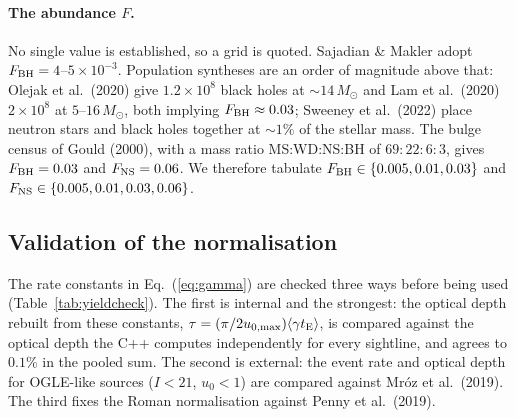\documentclass[english,10pt,a4paper]{article}
\newcommand{\tE}{t_{\rm E}}
\newcommand{\Msun}{M_\odot}
\begin{document}
\paragraph{The abundance $F$.} No single value is established, so a grid is quoted. Sajadian \&
Makler adopt $F_{\rm BH} = 4$--$5\times10^{-3}$. Population syntheses are an order of magnitude
above that: Olejak et al.\ (2020) give $1.2\times10^{8}$ black holes at $\sim\!14\,\Msun$ and
Lam et al.\ (2020) $2\times10^{8}$ at $5$--$16\,\Msun$, both implying $F_{\rm BH}\approx0.03$;
Sweeney et al.\ (2022) place neutron stars and black holes together at $\sim\!1\%$ of the stellar
mass. The bulge census of Gould (2000), with a mass ratio MS:WD:NS:BH of $69\!:\!22\!:\!6\!:\!3$,
gives $F_{\rm BH}=0.03$ and $F_{\rm NS}=0.06$. We therefore tabulate
$F_{\rm BH}\in\{0.005,0.01,0.03\}$ and $F_{\rm NS}\in\{0.005,0.01,0.03,0.06\}$.

\subsection{Validation of the normalisation}

The rate constants in Eq.~(\ref{eq:gamma}) are checked three ways before being used
(Table~\ref{tab:yieldcheck}). The first is internal and the strongest: the optical depth rebuilt
from these constants, $\tau = (\pi/2u_{0,\max})\langle\gamma \tE\rangle$, is compared against the
optical depth the C++ computes independently for every sightline, and agrees to $0.1\%$ in the
pooled sum. The second is external: the event rate and optical depth for OGLE-like sources
($I<21$, $u_0<1$) are compared against Mr\'oz et al.\ (2019). The third fixes the Roman
normalisation against Penny et al.\ (2019).
\end{document}

